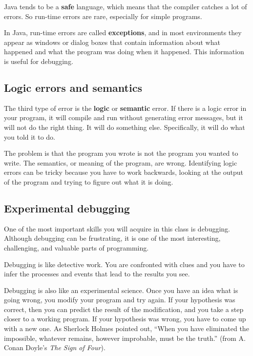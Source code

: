 \documentclass[12pt]{book}
\theoremstyle{definition}
\begin{document}
Java tends to be a {\bf safe}
language, which means that the compiler catches a lot of errors.
So run-time errors are rare, especially
for simple programs.

In Java, run-time errors are called {\bf exceptions},
and in most environments they appear as windows or dialog
boxes that contain information about what happened and what
the program was doing when it happened.  This information is
useful for debugging.

\subsection{Logic errors and semantics}

The third type of error is the {\bf logic} or {\bf semantic} error.
If there is a logic error in your program, it will compile and run
without generating error messages, but it will not do the right thing.
It will do something else.  Specifically, it will do what you told it
to do.

The problem is that the program you wrote is not the program you
wanted to write.  The semantics, or meaning of the program, are wrong.
Identifying logic errors can be tricky because you have to work
backwards, looking at the output of the program and trying to figure
out what it is doing.

\subsection{Experimental debugging}

One of the most important skills you will acquire in this
class is debugging.  Although debugging can be frustrating, it
is one of the most interesting, challenging, and
valuable parts of programming.

Debugging is like detective work.  You are
confronted with clues and you have to infer the processes
and events that lead to the results you see.

Debugging is also like an experimental science.  Once you have an idea
what is going wrong, you modify your program and try again.  If your
hypothesis was correct, then you can predict the result of the
modification, and you take a step closer to a working program.  If
your hypothesis was wrong, you have to come up with a new one.  As
Sherlock Holmes pointed out, ``When you have eliminated the
impossible, whatever remains, however improbable, must be the truth.''
(from A. Conan Doyle's {\em The Sign of Four}).
\end{document}
